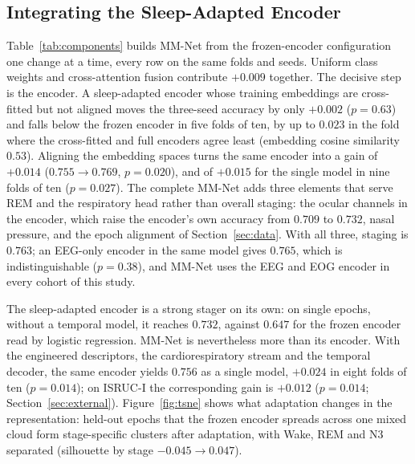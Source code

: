 \documentclass{ieeeaccess}
\newcommand{\mmAcc}{0.763}
\newcommand{\mmAccS}{0.756}
\begin{document}
\subsection{Integrating the Sleep-Adapted Encoder}
\label{sec:integration}
Table~\ref{tab:components} builds MM-Net from the frozen-encoder configuration one change at a
time, every row on the same folds and seeds. Uniform class weights and cross-attention fusion
contribute $+0.009$ together. The decisive step is the encoder. A sleep-adapted encoder whose
training embeddings are cross-fitted but not aligned moves the three-seed accuracy by only
$+0.002$ ($p=0.63$) and falls below the frozen encoder in five folds of ten, by up to $0.023$ in
the fold where the cross-fitted and full encoders agree least (embedding cosine similarity
$0.53$). Aligning the embedding spaces turns the same encoder into a gain of $+0.014$
($0.755\rightarrow0.769$, $p=0.020$), and of $+0.015$ for the single model in nine folds of ten
($p=0.027$). The complete MM-Net adds three elements that serve REM and the respiratory head
rather than overall staging: the ocular channels in the encoder, which raise the encoder's own
accuracy from $0.709$ to $0.732$, nasal pressure, and the epoch alignment of
Section~\ref{sec:data}. With all three, staging is $\mmAcc$; an EEG-only encoder in the same model
gives $0.765$, which is indistinguishable ($p=0.38$), and MM-Net uses the EEG and EOG encoder in
every cohort of this study.

The sleep-adapted encoder is a strong stager on its own: on single epochs, without a temporal
model, it reaches $0.732$, against $0.647$ for the frozen encoder read by logistic regression.
MM-Net is nevertheless more than its encoder. With the engineered descriptors, the
cardiorespiratory stream and the temporal decoder, the same encoder yields $\mmAccS$ as a single
model, $+0.024$ in eight folds of ten ($p=0.014$); on ISRUC-I the corresponding gain is $+0.012$
($p=0.014$; Section~\ref{sec:external}). Figure~\ref{fig:tsne} shows what adaptation changes in
the representation: held-out epochs that the frozen encoder spreads across one mixed cloud
form stage-specific clusters after adaptation, with Wake, REM and N3 separated (silhouette by
stage $-0.045\rightarrow0.047$).
\end{document}
